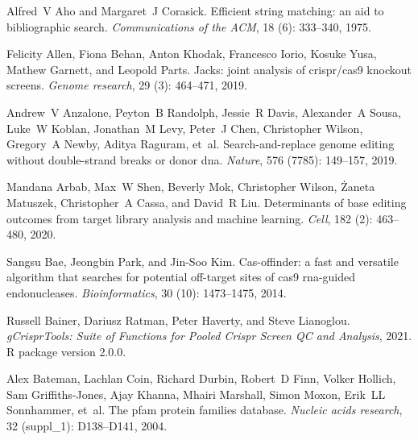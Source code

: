 \documentclass[pdftex,english,10pt]{article}
\begin{document}
{\begin{thebibliography}{105}
Alfred~V Aho and Margaret~J Corasick.
\newblock Efficient string matching: an aid to bibliographic search.
\newblock \emph{Communications of the ACM}, 18 (6): 333--340,
  1975.

Felicity Allen, Fiona Behan, Anton Khodak, Francesco Iorio, Kosuke Yusa, Mathew
  Garnett, and Leopold Parts.
\newblock Jacks: joint analysis of crispr/cas9 knockout screens.
\newblock \emph{Genome research}, 29 (3): 464--471, 2019.

Andrew~V Anzalone, Peyton~B Randolph, Jessie~R Davis, Alexander~A Sousa, Luke~W
  Koblan, Jonathan~M Levy, Peter~J Chen, Christopher Wilson, Gregory~A Newby,
  Aditya Raguram, et~al.
\newblock Search-and-replace genome editing without double-strand breaks or
  donor dna.
\newblock \emph{Nature}, 576 (7785): 149--157, 2019.

Mandana Arbab, Max~W Shen, Beverly Mok, Christopher Wilson, {\.Z}aneta
  Matuszek, Christopher~A Cassa, and David~R Liu.
\newblock Determinants of base editing outcomes from target library analysis
  and machine learning.
\newblock \emph{Cell}, 182 (2): 463--480, 2020.

Sangsu Bae, Jeongbin Park, and Jin-Soo Kim.
\newblock Cas-offinder: a fast and versatile algorithm that searches for
  potential off-target sites of cas9 rna-guided endonucleases.
\newblock \emph{Bioinformatics}, 30 (10): 1473--1475, 2014.

Russell Bainer, Dariusz Ratman, Peter Haverty, and Steve Lianoglou.
\newblock \emph{gCrisprTools: Suite of Functions for Pooled Crispr Screen QC
  and Analysis}, 2021.
\newblock R package version 2.0.0.

Alex Bateman, Lachlan Coin, Richard Durbin, Robert~D Finn, Volker Hollich, Sam
  Griffiths-Jones, Ajay Khanna, Mhairi Marshall, Simon Moxon, Erik~LL
  Sonnhammer, et~al.
\newblock The pfam protein families database.
\newblock \emph{Nucleic acids research}, 32 (suppl\_1):
  D138--D141, 2004.


\end{thebibliography}}
\end{document}

